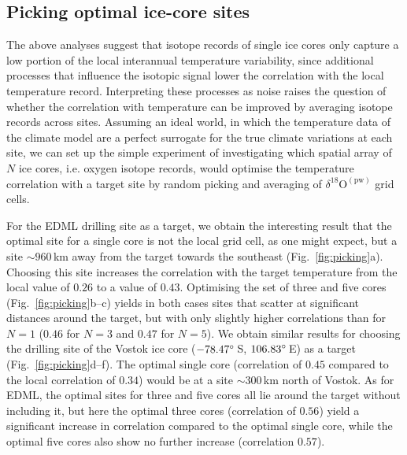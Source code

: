 \documentclass[cp, manuscript]{copernicus}
\begin{document}
\subsection{Picking optimal ice-core sites}
\label{results:picking}

The above analyses suggest that isotope records of single ice cores only
capture a low portion of the local interannual temperature variability, since
additional processes that influence the isotopic signal lower the correlation
with the local temperature record. Interpreting these processes as noise raises
the question of whether the correlation with temperature can be improved by
averaging isotope records across sites. Assuming an ideal world, in which the
temperature data of the climate model are a perfect surrogate for the true
climate variations at each site, we can set up the simple experiment of
investigating which spatial array of $N$ ice cores, i.e. oxygen isotope records,
would optimise the temperature correlation with a target site by
random picking and averaging of $\delta^{18}\mathrm{O}^{\mathrm{(pw)}}$ grid
cells.

For the EDML drilling site as a target, we obtain the interesting result that
the optimal site for a single core is not the local grid cell, as one might
expect, but a site $\sim960$\,km away from the target towards the southeast
(Fig.~\ref{fig:picking}a). Choosing this site increases the correlation with the
target temperature from the local value of $0.26$ to a value of
$0.43$. Optimising the set of three and five cores
(Fig.~\ref{fig:picking}b--c) yields in both cases sites that scatter at
significant distances around the target, but with only slightly higher
correlations than for $N=1$ ($0.46$ for $N=3$ and $0.47$ for $N=5$). We obtain
similar results for choosing the drilling site of the Vostok ice core
($-78.47^{\circ}$\,S, $106.83^{\circ}$\,E) as a target
(Fig.~\ref{fig:picking}d--f). The optimal single core (correlation of $0.45$
compared to the local correlation of $0.34$) would be at a site $\sim300$\,km
north of Vostok. As for EDML, the optimal sites for three and five cores all lie
around the target without including it, but here the optimal three cores
(correlation of $0.56$) yield a significant increase in correlation compared to
the optimal single core, while the optimal five cores also show no further
increase (correlation $0.57$).
\end{document}
